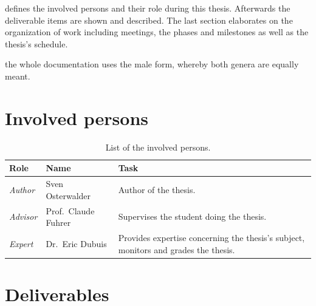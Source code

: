 \documentclass[%
    a4paper,    %
    justified,  %
    nobib,      %
    openany     %
]{tufte-book}
\begin{document}
 defines the involved persons and their role
during this thesis. Afterwards the deliverable items are shown and described.
The last section elaborates on the organization of work including meetings, the
phases and milestones as well as the thesis's schedule.

 the whole documentation uses the male form, whereby both
genera are equally meant.

\section{Involved persons}
\label{sec:involved_persons}

\begin{table}[h]
  \caption{List of the involved persons.}
  \begin{tabularx}{\textwidth}{llX}
    \toprule
    \textbf{Role} & \textbf{Name} & \textbf{Task} \\
    \midrule
    \textit{Author}  & Sven Osterwalder\protect\footnotemark[1]{} & Author of the thesis.\\
    \textit{Advisor} & Prof.\ Claude Fuhrer\protect\footnotemark[2]{} & Supervises the student doing the thesis.\\
    \textit{Expert}  & Dr.\ Eric Dubuis\protect\footnotemark[3]{}     & Provides expertise concerning the thesis's subject, monitors and grades the thesis.\\
    \bottomrule
  \end{tabularx}
\end{table}

\newpage{}

\section{Deliverables}
\label{sec:deliverables}
\end{document}
